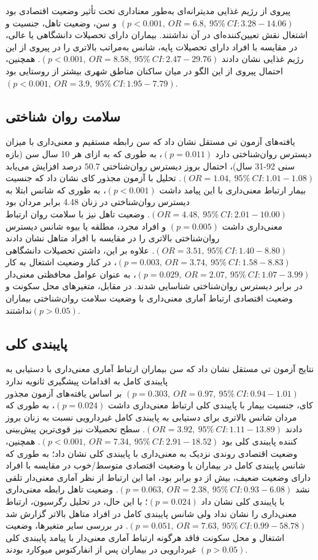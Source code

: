 پیروی از رژیم غذایی مدیترانه‌ای به‌طور معناداری تحت تأثیر وضعیت اقتصادی بود $(p<0.001, \ OR=6.8, \ 95\% \ CI:3.28-14.06)$ و سن، وضعیت تاهل، جنسیت و اشتغال نقش تعیین‌کننده‌ای در آن نداشتند. بیماران دارای تحصیلات دانشگاهی یا عالی، در مقایسه با افراد دارای تحصیلات پایه، شانس به‌مراتب بالاتری را در پیروی از این رژیم غذایی نشان دادند $(p<0.001, \ OR=8.58, \ 95\% \ CI:2.47-29.76)$. همچنین، احتمال پیروی از این الگو در میان ساکنان مناطق شهری بیشتر از روستایی بود $(p<0.001, \ OR=3.9, \ 95\% \ CI:1.95-7.79)$.

\subsection*{\textbf{سلامت روان شناختی}}


یافته‌های آزمون تی مستقل نشان داد که سن رابطه مستقیم و معنی‌داری با میزان دیسترس روان‌شناختی دارد $(p=0.011)$، به طوری که به ازای هر 10 سال سن (بازه سنی 92-31 سال)، احتمال بروز دیسترس روان‌شناختی $50.7$ درصد افزایش می‌یابد $(OR=1.04, \ 95\% \ CI:1.01-1.08)$. تحلیل‌ با آزمون مجذور کای نشان داد که جنسیت بیمار ارتباط معنی‌داری با این پیامد داشت $(p<0.001)$، به طوری که شانس ابتلا به دیسترس روان‌شناختی در زنان 4.48 برابر مردان بود $(OR=4.48, \ 95\% \ CI:2.01-10.00)$. وضعیت تاهل نیز با سلامت روان ارتباط معنی‌داری داشت $(p=0.005)$ و افراد مجرد، مطلقه یا بیوه شانس دیسترس روان‌شناختی بالاتری را در مقایسه با افراد متاهل نشان دادند $(OR=3.51, \ 95\% \ CI:1.40-8.80)$. علاوه بر این، داشتن تحصیلات دانشگاهی $(p=0.003, \ OR=3.74, \ 95\% \ CI:1.58-8.83)$، در کنار وضعیت اشتغال به کار $(p=0.029, \ OR=2.07, \ 95\% \ CI:1.07-3.99)$، به عنوان عوامل محافظتی معنی‌دار در برابر دیسترس روان‌شناختی شناسایی شدند. در مقابل، متغیرهای محل سکونت و وضعیت اقتصادی ارتباط آماری معنی‌داری با وضعیت سلامت روان‌شناختی بیماران نداشتند$(p>0.05)$.

\subsection*{\textbf{پایبندی کلی}}


نتایج آزمون تی مستقل نشان داد که سن بیماران ارتباط آماری معنی‌داری با دستیابی به پایبندی کامل به اقدامات پیشگیری ثانویه ندارد $(p=0.303, \ OR=0.97, \ 95\% \ CI:0.94-1.01)$ بر اساس یافته‌های آزمون مجذور کای، جنسیت بیمار با پایبندی کلی ارتباط معنی‌داری داشت $(p=0.024)$، به طوری که مردان شانس بالاتری برای دستیابی به پایبندی کامل غیردارویی نسبت به زنان بروز دادند $(OR=3.92, \ 95\% \ CI:1.11-13.89)$. سطح تحصیلات نیز قوی‌ترین پیش‌بینی کننده پایبندی کلی بود $(p<0.001, \ OR=7.34, \ 95\% \ CI:2.91-18.52)$. همچنین، وضعیت اقتصادی روندی نزدیک به معنی‌داری با پایبندی کلی نشان داد؛ به طوری که شانس پایبندی کامل در بیماران با وضعیت اقتصادی متوسط/خوب در مقایسه با افراد دارای وضعیت ضعیف، بیش از دو برابر بود، اما این ارتباط از نظر آماری معنی‌دار تلقی نشد $(p=0.063, \ OR=2.38, \ 95\% \ CI:0.93-6.08)$. وضعیت تاهل رابطه معنی‌داری با پایبندی کلی نشان داد $(p=0.024)$؛ با این حال، در تحلیل رگرسیون، ارتباط معنی‌داری را نشان نداد ولی شانس پایبندی کامل در افراد متاهل بالاتر گزارش شد $(p=0.051, \ OR=7.63, \ 95\% \ CI:0.99-58.78)$. در بررسی سایر متغیرها، وضعیت اشتغال و محل سکونت فاقد هرگونه ارتباط آماری معنی‌دار با پیامد پایبندی کلی غیردارویی در بیماران پس از انفارکتوس میوکارد بودند $(p>0.05)$.

